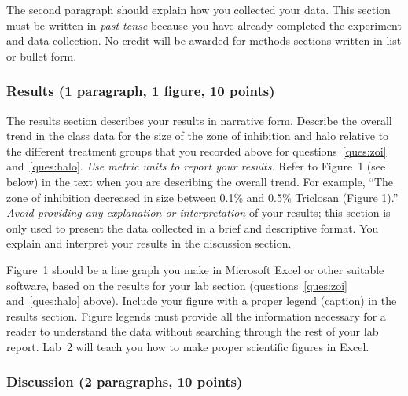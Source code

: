 \documentclass[12pt]{exam}
\begin{document}
The second paragraph should explain how you
collected your data. This section must be written in \emph{past tense} because you have
already completed the experiment and data collection. No credit will be
awarded for methods sections written in list or bullet form.

\subsubsection*{Results (1 paragraph, 1 figure, 10 points)}


The results section describes your results in narrative
form. Describe the overall trend in the class data for the size of the zone of inhibition and halo 
relative to the different treatment groups that you recorded above for questions~\ref{ques:zoi} and~\ref{ques:halo}. \emph{Use metric
units to report your results.} Refer to Figure~1 (see below) in the text when you are describing 
the overall trend. For example, ``The zone of inhibition decreased in
size between 0.1\% and 0.5\% Triclosan (Figure 1).'' \emph{Avoid
providing any explanation or interpretation} of your results; this
section is only used to present the data collected in a brief and
descriptive format. You explain and interpret your results in the discussion section. 


Figure~1 should be a line graph you make in Microsoft Excel or other suitable software, based on the results for your lab section (questions~\ref{ques:zoi} and~\ref{ques:halo} above). Include your figure with a proper legend (caption) in the results section. Figure legends
must provide all the information necessary for a reader to understand
the data without searching through the rest of your lab report. Lab~2 will teach you how to make proper scientific figures in Excel.


\subsubsection*{Discussion (2 paragraphs, 10 points)} 
\end{document}
